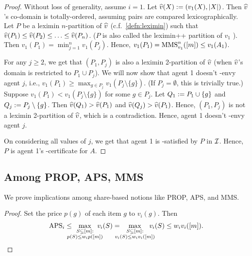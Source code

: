 \begin{proof}
Without loss of generality, assume $i = 1$.
Let $\widehat{v}(X) := (v_1(X), |X|)$.
Then $\widehat{v}$'s co-domain is totally-ordered, assuming pairs are compared lexicographically.
Let $P$ be a leximin $n$-partition of $\widehat{v}$ (c.f.~\cref{defn:leximin})
such that $\widehat{v}(P_1) \le \widehat{v}(P_2) \le \ldots \le \widehat{v}(P_n)$.
($P$ is also called the leximin++ partition of $v_1$ \citep{plaut2020almost}).
Then $v_1(P_1) = \min_{j=1}^n v_1(P_j)$.
Hence, $v_1(P_1) = \mathrm{MMS}_{v_1}^n([m]) \le v_1(A_1)$.

For any $j \ge 2$, we get that $(P_1, P_j)$ is also a leximin 2-partition of $\widehat{v}$
(when $\widehat{v}$'s domain is restricted to $P_1 \cup P_j$).
We will now show that agent 1 doesn't \EFXZero{}-envy agent $j$, i.e.,
$v_1(P_1) \ge \max_{g \in P_j} v_1(P_j \setminus \{g\})$.
(If $P_j = \emptyset$, this is trivially true.)
Suppose $v_1(P_1) < v_1(P_j \setminus \{g\})$ for some $g \in P_j$.
Let $Q_1 := P_1 \cup \{g\}$ and $Q_j := P_j \setminus \{g\}$.
Then $\widehat{v}(Q_1) > \widehat{v}(P_1)$ and $\widehat{v}(Q_j) > \widehat{v}(P_1)$.
Hence, $(P_1, P_j)$ is not a leximin 2-partition of $\widehat{v}$, which is a contradiction.
Hence, agent 1 doesn't \EFXZero{}-envy agent $j$.

On considering all values of $j$, we get that agent 1 is \EFXZero-satisfied by $P$ in $\mathcal{I}$.
Hence, $P$ is agent 1's \MXSZero{}-certificate for $A$.
\end{proof}

\subsection{Among PROP, APS, MMS}

We prove implications among share-based notions like PROP, APS, and MMS.

\begin{proof}
Set the price $p(g)$ of each item $g$ to $v_i(g)$. Then
\[ \APS_i \le \!\!\!\!\!\!\max_{\substack{S \subseteq [m]:\\p(S) \le w_ip([m])}} \!\!\!\!\!\!v_i(S)
= \!\!\!\!\!\!\max_{\substack{S \subseteq [m]:\\v_i(S) \le w_iv_i([m])}} \!\!\!\!\!\!v_i(S) \le w_iv_i([m]).
\qedhere \]
\end{proof}

